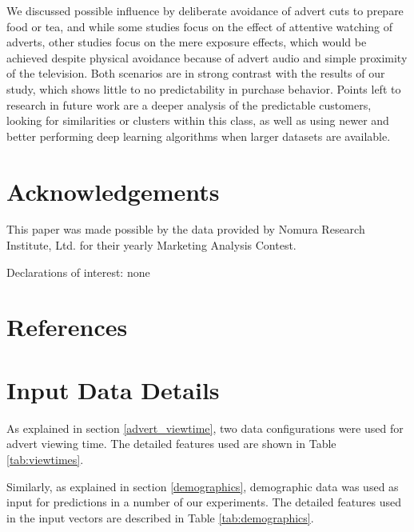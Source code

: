 \documentclass[review]{elsarticle}
\begin{document}
We discussed possible influence by deliberate avoidance of advert cuts to prepare food or tea, and while some studies focus on the effect of attentive watching of adverts, other studies focus on the mere exposure effects, which would be achieved despite physical avoidance because of advert audio and simple proximity of the television. Both scenarios are in strong contrast with the results of our study, which shows little to no predictability in purchase behavior. Points left to research in future work are a deeper analysis of the predictable customers, looking for similarities or clusters within this class, as well as using newer and better performing deep learning algorithms when larger datasets are available. 

\section{Acknowledgements}

This paper was made possible by the data provided by Nomura Research Institute, Ltd. for their yearly Marketing Analysis Contest.

Declarations of interest: none

\section*{References}



\clearpage
\appendix
\appendixpage

\section{Input Data Details}
\label{appendix:inputs}

As explained in section \ref{advert_viewtime}, two data configurations were used for advert viewing time. The detailed features used are shown in Table \ref{tab:viewtimes}. 

Similarly, as explained in section \ref{demographics}, demographic data was used as input for predictions in a number of our experiments. The detailed features used in the input vectors are described in Table \ref{tab:demographics}.
\end{document}
